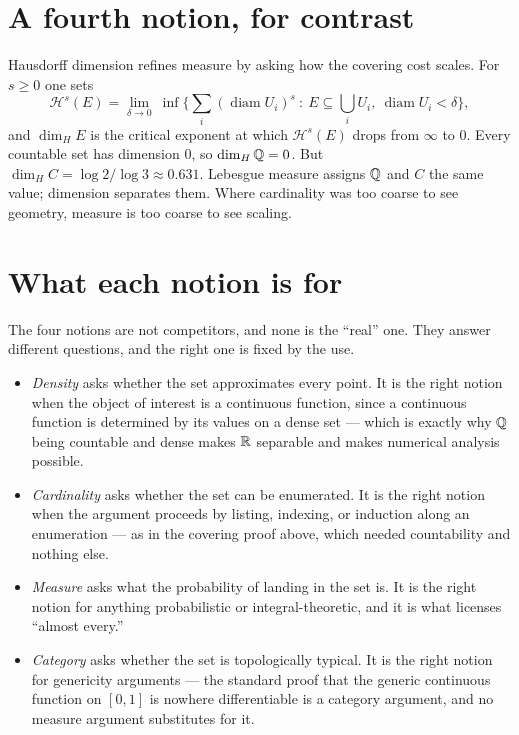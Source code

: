 \documentclass{essay}
\DeclareMathOperator{\diam}{diam}
\begin{document}
\section{A fourth notion, for contrast}

Hausdorff dimension refines measure by asking how the covering cost
scales. For \(s \geq 0\) one sets
\[ \mathcal{H}^{s}(E) = \lim_{\delta \to 0}\ \inf\Big\{ \sum_{i} (\diam U_{i})^{s} \ :\ E \subseteq \bigcup_{i} U_{i},\ \diam U_{i} < \delta \Big\}, \]
and \(\dim_{H} E\) is the critical exponent at which \(\mathcal{H}^{s}(E)\)
drops from \(\infty\) to \(0\). Every countable set has dimension \(0\), so
\(\dim_{H} \mathbb{Q} = 0\). But \(\dim_{H} C = \log 2 / \log 3 \approx 0.631\).
Lebesgue measure assigns \(\mathbb{Q}\) and \(C\) the same value; dimension
separates them. Where cardinality was too coarse to see geometry,
measure is too coarse to see scaling.

\section{What each notion is for}

The four notions are not competitors, and none is the ``real'' one.
They answer different questions, and the right one is fixed by the use.

\begin{itemize}
  \item \emph{Density} asks whether the set approximates every point. It
    is the right notion when the object of interest is a continuous
    function, since a continuous function is determined by its values on a
    dense set --- which is exactly why \(\mathbb{Q}\) being countable and dense makes
    \(\mathbb{R}\) separable and makes numerical analysis possible.

  \item \emph{Cardinality} asks whether the set can be enumerated. It is
    the right notion when the argument proceeds by listing, indexing, or
    induction along an enumeration --- as in the covering proof above,
    which needed countability and nothing else.

  \item \emph{Measure} asks what the probability of landing in the set
    is. It is the right notion for anything probabilistic or
    integral-theoretic, and it is what licenses ``almost every.''

  \item \emph{Category} asks whether the set is topologically typical. It
    is the right notion for genericity arguments --- the standard proof
    that the generic continuous function on \([0,1]\) is nowhere
    differentiable is a category argument, and no measure argument
    substitutes for it.
\end{itemize}
\end{document}

